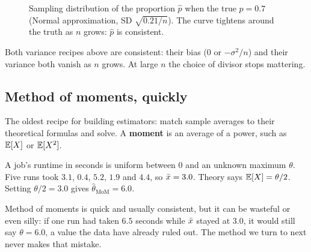 \begin{figure}[H]
\centering
{}
\caption{Sampling distribution of the proportion $\hat p$ when the true $p=0.7$
(Normal approximation, SD $\sqrt{0.21/n}$). The curve tightens around the truth as
$n$ grows: $\hat p$ is consistent.}
\label{fig:lik-consistency}
\end{figure}

Both variance recipes above are consistent: their bias ($0$ or $-\sigma^2/n$) and their
variance both vanish as $n$ grows. At large $n$ the choice of divisor stops mattering.

\subsection{Method of moments, quickly}

The oldest recipe for building estimators: match sample averages to their theoretical
formulas and solve. A \textbf{moment} is an average of a power, such as $\operatorname{\mathbb{E}}[X]$ or
$\operatorname{\mathbb{E}}[X^2]$.

\begin{example}
A job's runtime in seconds is uniform between $0$ and an unknown maximum $\theta$.
Five runs took $3.1$, $0.4$, $5.2$, $1.9$ and $4.4$, so $\bar{x} = 3.0$. Theory says
$\operatorname{\mathbb{E}}[X]=\theta/2$. Setting $\theta/2 = 3.0$ gives $\hat\theta_{\text{MoM}} = 6.0$.
\end{example}

Method of moments is quick and usually consistent, but it can be wasteful or even
silly: if one run had taken $6.5$ seconds while $\bar{x}$ stayed at $3.0$, it would
still say $\theta = 6.0$, a value the data have already ruled out. The method we turn to
next never makes that mistake.

